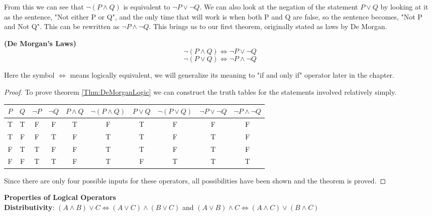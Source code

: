 From this we can see that $\neg (P \land Q)$ is equivalent to $\neg P \lor \neg Q$.
We can also look at the negation of the statement $P \lor Q$ by looking at it as the sentence, "Not either P or Q", and the only time that will work is when both P and Q are false, so the sentence becomes, "Not P and Not Q".
This can be rewritten as $\neg P \land \neg Q$.
This brings us to our first theorem, originally stated as laws by De Morgan.

\begin{thm}
	\textbf{(De Morgan's Laws)} \\
	\label{Thm:DeMorganLogic}
	\begin{equation}
		\nonumber
		\neg ( P \land Q ) \iff \neg P \lor \neg Q
	\end{equation}
	\begin{equation}
		\nonumber
		\neg ( P \lor Q ) \iff \neg P \land \neg Q
	\end{equation}
\end{thm}
Here the symbol $\iff$ means logically equivalent, we will generalize its meaning to "if and only if" operator later in the chapter.

\begin{proof}
	To prove theorem \ref{Thm:DeMorganLogic} we can construct the truth tables for the statements involved relatively simply.
	\begin{table*}[ht]
	\begin{center}
	\begin{tabular}{cc|cc|cccccc}
			$P$ & $Q$ & $\neg P$ & $\neg Q$ & $P \land Q$ & $\neg (P \land Q)$ & $P \lor Q$ & $\neg (P \lor Q)$ & $\neg P \lor \neg Q$ & $\neg P \land \neg Q$ \\
			\hline
			T & T & F & F & T & F & T & F & F & F \\
			T & F & F & T & F & T & T & F & T & F \\
			F & T & T & F & F & T & T & F & T & F \\
			F & F & T & T & F & T & F & T & T & T \\
	\end{tabular}
	\end{center}
	\end{table*}
	Since there are only four possible inputs for these operators, all possibilities have been shown and the theorem is proved.
\end{proof}

\begin{thm}
	\textbf{Properties of Logical Operators}\\
	\label{thm:proplogical}
	\textbf{Distributivity}: $(A \land B) \lor C \iff (A \lor C) \land (B \lor C)$ and $(A \lor B) \land C \iff (A \land C) \lor (B \land C)$
	
\end{thm}

